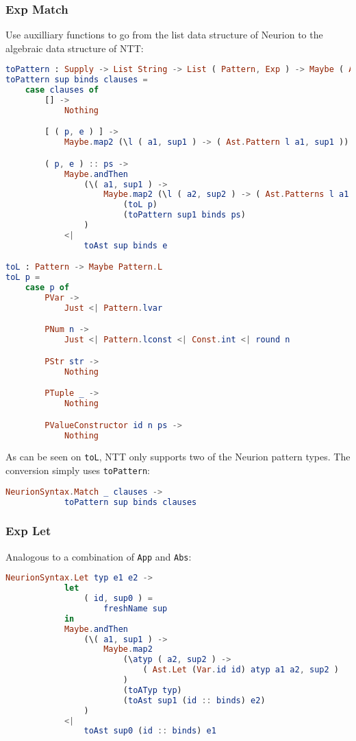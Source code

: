 \documentclass[10pt,a4paper,english]{article}
\begin{document}
\subsubsection*{Exp Match}
Use auxilliary functions to go from the list data structure of Neurion to the algebraic data structure of NTT:
\begin{lstlisting}[language=elm,%
                     label="eval-evaluated",%
                     gobble=0,%
                     ]
toPattern : Supply -> List String -> List ( Pattern, Exp ) -> Maybe ( Ast, Supply )
toPattern sup binds clauses =
    case clauses of
        [] ->
            Nothing

        [ ( p, e ) ] ->
            Maybe.map2 (\l ( a1, sup1 ) -> ( Ast.Pattern l a1, sup1 )) (toL p) (toAst sup binds e)

        ( p, e ) :: ps ->
            Maybe.andThen
                (\( a1, sup1 ) ->
                    Maybe.map2 (\l ( a2, sup2 ) -> ( Ast.Patterns l a1 a2, sup2 ))
                        (toL p)
                        (toPattern sup1 binds ps)
                )
            <|
                toAst sup binds e

toL : Pattern -> Maybe Pattern.L
toL p =
    case p of
        PVar ->
            Just <| Pattern.lvar

        PNum n ->
            Just <| Pattern.lconst <| Const.int <| round n

        PStr str ->
            Nothing

        PTuple _ ->
            Nothing

        PValueConstructor id n ps ->
            Nothing
\end{lstlisting}
As can be seen on \texttt{toL}, NTT only supports two of the Neurion pattern types. The conversion simply uses \texttt{toPattern}:
\begin{lstlisting}[language=elm,%
                     label="eval-evaluated",%
                     gobble=8,%
                     ]
        NeurionSyntax.Match _ clauses ->
            toPattern sup binds clauses
\end{lstlisting}

\subsubsection*{Exp Let}
Analogous to a combination of \texttt{App} and \texttt{Abs}:
\begin{lstlisting}[language=elm,%
                     label="eval-evaluated",%
                     gobble=8,%
                     ]
        NeurionSyntax.Let typ e1 e2 ->
            let
                ( id, sup0 ) =
                    freshName sup
            in
            Maybe.andThen
                (\( a1, sup1 ) ->
                    Maybe.map2
                        (\atyp ( a2, sup2 ) ->
                            ( Ast.Let (Var.id id) atyp a1 a2, sup2 )
                        )
                        (toATyp typ)
                        (toAst sup1 (id :: binds) e2)
                )
            <|
                toAst sup0 (id :: binds) e1
\end{lstlisting}
\end{document}
